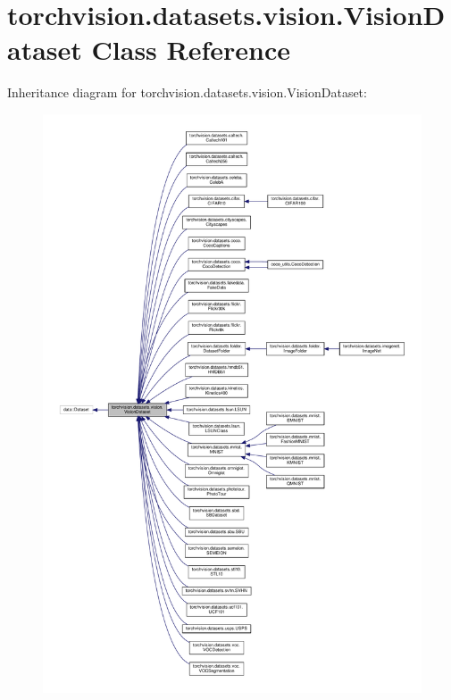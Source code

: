 \hypertarget{classtorchvision_1_1datasets_1_1vision_1_1VisionDataset}{}\section{torchvision.\+datasets.\+vision.\+Vision\+Dataset Class Reference}
\label{classtorchvision_1_1datasets_1_1vision_1_1VisionDataset}


Inheritance diagram for torchvision.\+datasets.\+vision.\+Vision\+Dataset\+:
\nopagebreak
\begin{figure}[H]
\begin{center}
\leavevmode
\includegraphics[width=350pt]{classtorchvision_1_1datasets_1_1vision_1_1VisionDataset__inherit__graph}
\end{center}
\end{figure}


